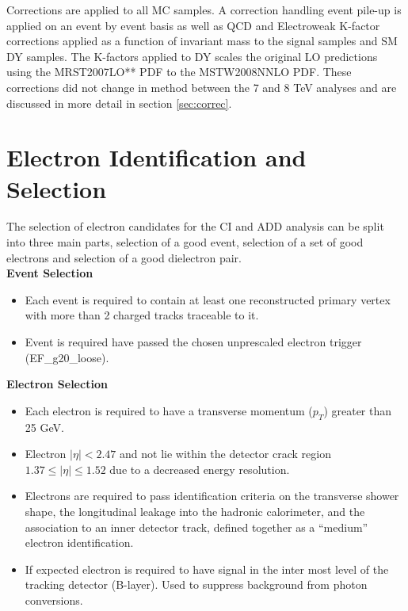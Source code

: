 	Corrections are applied to all MC samples. A correction handling event pile-up is applied on an event by event basis as well as QCD and Electroweak K-factor corrections applied as a function of invariant mass to the signal samples and SM DY samples. The K-factors applied to DY scales the original LO predictions using the MRST2007LO** \cite{Martin:2004dh} PDF to the MSTW2008NNLO \cite{Martin:2009iq} PDF. These corrections did not change in method between the 7 and 8 TeV analyses and are discussed in more detail in section \ref{sec:correc}.



\section{Electron Identification and Selection}

	The selection of electron candidates for the CI and ADD analysis can be split into three main parts, selection of a good event, selection of a set of good electrons and selection of a good dielectron pair.\\

	{\bf Event Selection}
	\begin{itemize}
	\item Each event is required to contain at least one reconstructed primary vertex with more than 2 charged tracks traceable to it.
	\item Event is required have passed the chosen unprescaled electron trigger (EF\_g20\_loose).
	\end{itemize}

	{\bf Electron Selection}
	\begin{itemize}
	\item Each electron is required to have a transverse momentum ($p_{T}$) greater than 25 GeV.
	\item Electron $|\eta| < 2.47$ and not lie within the detector crack region $1.37 \leq |\eta| \leq 1.52$ due to a decreased energy resolution.
	\item Electrons are required to pass identification criteria on the transverse shower shape, the longitudinal leakage into the hadronic calorimeter, and the association to an inner detector track, defined together as a ``medium'' electron identification.
	\item If expected electron is required to have signal in the inter most level of the tracking detector (B-layer). Used to suppress background from photon conversions.
	\end{itemize}

